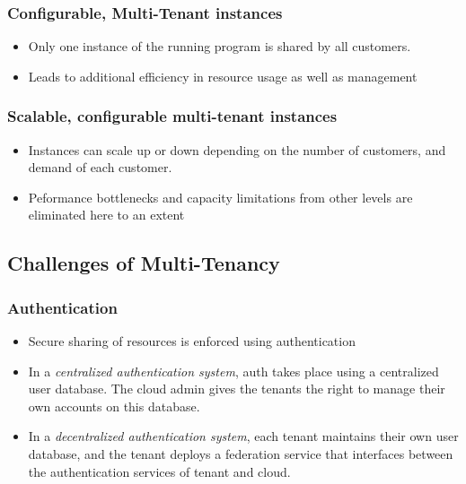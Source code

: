 \documentclass{article}
\begin{document}
\subsubsection{Configurable, Multi-Tenant instances}
\begin{itemize}
    \item Only one instance of the running program is shared by all customers.
    
    \item Leads to additional efficiency in resource usage as well as management
\end{itemize}

\subsubsection{Scalable, configurable multi-tenant instances}
\begin{itemize}
    \item Instances can scale up or down depending on the number of customers, and demand of each customer.
    
    \item Peformance bottlenecks and capacity limitations from other levels are eliminated here to an extent
\end{itemize}

\subsection{Challenges of Multi-Tenancy}
\subsubsection{Authentication}
\begin{itemize}
    \item Secure sharing of resources is enforced using authentication
    
    \item In a \textit{centralized authentication system}, auth takes place using a centralized user database. The cloud admin gives the tenants the right to manage their own accounts on this database. 
    
    \item In a \textit{decentralized authentication system}, each tenant maintains their own user database, and the tenant deploys a federation service that interfaces between the authentication services of tenant and cloud.
\end{itemize}
\end{document}

